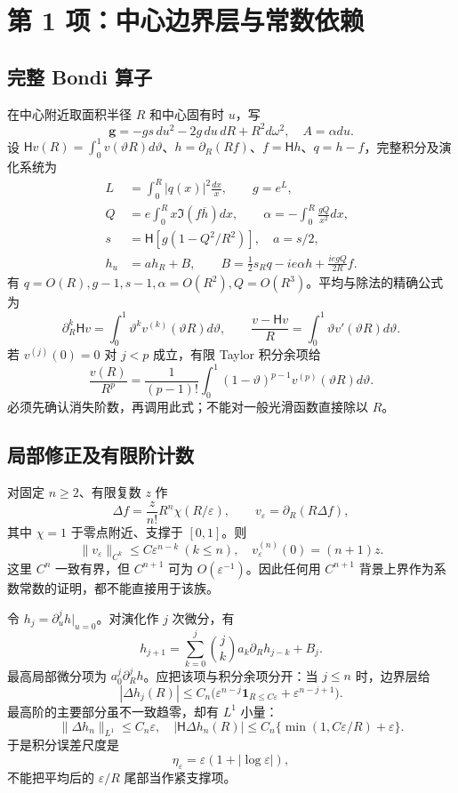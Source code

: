 \section{第 1 项：中心边界层与常数依赖}
\subsection{完整 Bondi 算子}
在中心附近取面积半径 $R$ 和中心固有时 $u$，写
\[
\mathbf g=-gs\,du^2-2g\,du\,dR+R^2d\omega^2,\quad A=\alpha du.
\]
设 $\mathsf Hv(R)=\int_0^1v(\vartheta R)d\vartheta$、$h=\partial_R(Rf)$、$f=\mathsf Hh$、$q=h-f$，完整积分及演化系统为
\begin{equation}\label{eq:bondi}
\begin{split}
L&=\int_0^R|q(x)|^2\frac{dx}{x},\qquad g=e^L,\\
Q&=e\int_0^Rx\Im(f\overline h)dx,
\qquad\alpha=-\int_0^R\frac{gQ}{x^2}dx,\\
s&=\mathsf H[g(1-Q^2/R^2)],\quad a=s/2,\\
h_u&=ah_R+B,\qquad
B=\tfrac12s_Rq-ie\alpha h+\frac{iegQ}{2R}f.
\end{split}
\end{equation}
有 $q=O(R),g-1,s-1,\alpha=O(R^2),Q=O(R^3)$。平均与除法的精确公式为
\[
\partial_R^k\mathsf Hv=\int_0^1\vartheta^kv^{(k)}(\vartheta R)d\vartheta,
\qquad\frac{v-\mathsf Hv}{R}=\int_0^1\vartheta v'(\vartheta R)d\vartheta.
\]
若 $v^{(j)}(0)=0$ 对 $j<p$ 成立，有限 Taylor 积分余项给
\begin{equation}\label{eq:division}
\frac{v(R)}{R^p}=\frac1{(p-1)!}
\int_0^1(1-\vartheta)^{p-1}v^{(p)}(\vartheta R)d\vartheta.
\end{equation}
必须先确认消失阶数，再调用此式；不能对一般光滑函数直接除以 $R$。

\subsection{局部修正及有限阶计数}
对固定 $n\ge2$、有限复数 $z$ 作
\[
\Delta f=\frac z{n!}R^n\chi(R/\varepsilon),\qquad
v_\varepsilon=\partial_R(R\Delta f),
\]
其中 $\chi=1$ 于零点附近、支撑于 $[0,1]$。则
\[
\|v_\varepsilon\|_{C^k}\le C\varepsilon^{n-k}\ (k\le n),\quad
v_\varepsilon^{(n)}(0)=(n+1)z.
\]
这里 $C^n$ 一致有界，但 $C^{n+1}$ 可为 $O(\varepsilon^{-1})$。因此任何用 $C^{n+1}$ 背景上界作为系数常数的证明，都不能直接用于该族。

令 $h_j=\partial_u^jh|_{u=0}$。对演化作 $j$ 次微分，有
\[
h_{j+1}=\sum_{k=0}^j{j\choose k}a_k\partial_Rh_{j-k}+B_j.
\]
最高局部微分项为 $a_0^j\partial_R^jh$。应把该项与积分余项分开：当 $j\le n$ 时，边界层给
\begin{equation}\label{eq:layer}
|\Delta h_j(R)|\le C_n\bigl(
\varepsilon^{n-j}\mathbf1_{R\le C\varepsilon}
+\varepsilon^{n-j+1}\bigr).
\end{equation}
最高阶的主要部分虽不一致趋零，却有 $L^1$ 小量：
\[
\|\Delta h_n\|_{L^1}\le C_n\varepsilon,
\quad |\mathsf H\Delta h_n(R)|
\le C_n\{\min(1,C\varepsilon/R)+\varepsilon\}.
\]
于是积分误差尺度是
\[
\eta_\varepsilon=\varepsilon(1+|\log\varepsilon|),
\]
不能把平均后的 $\varepsilon/R$ 尾部当作紧支撑项。

